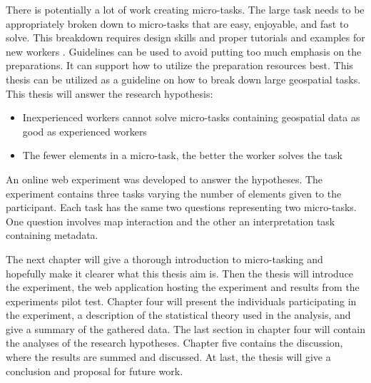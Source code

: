 There is potentially a lot of work creating micro-tasks. The large task needs to be appropriately broken down to micro-tasks that are easy, enjoyable, and fast to solve. This breakdown requires design skills and proper tutorials and examples for new workers \citep{Schulze2012}. 
Guidelines can be used to avoid putting too much emphasis on the preparations. It can support how to utilize the preparation resources best. This thesis can be utilized as a guideline on how to break down large geospatial tasks.\\

This thesis will answer the research hypothesis: 
\begin{itemize}
	\item Inexperienced workers cannot solve micro-tasks containing geospatial data as good as experienced workers
	\item The fewer elements in a micro-task, the better the worker solves the task
\end{itemize}
\vspace{0.3cm}
An online web experiment was developed to answer the hypotheses. The experiment contains three tasks varying the number of elements given to the participant. Each task has the same two questions representing two micro-tasks. One question involves map interaction and the other an interpretation task containing metadata. 

The next chapter will give a thorough introduction to micro-tasking and hopefully make it clearer what this thesis aim is. Then the thesis will introduce the experiment, the web application hosting the experiment and results from the experiments pilot test. Chapter four will present the individuals participating in the experiment, a description of the statistical theory used in the analysis, and give a summary of the gathered data. The last section in chapter four will contain the analyses of the research hypotheses. Chapter five contains the discussion, where the results are summed and discussed. At last, the thesis will give a conclusion and proposal for future work.
 
 
